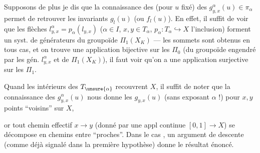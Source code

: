 
Supposons de plus    je dis que la connaissance des (pour $u$ fixé) des $g_{y,x}^\alpha(u)\in\pi_\alpha$  permet de retrouver  les invariants $g_l(u)$ (ou $f_l(u)$). En effet, il suffit de voir que les flèches $l_{y,x}^\alpha=p_\alpha(l_{y,x})$ ($\alpha\in I$, $x,y\in T_\alpha$, $p_\alpha:T_\alpha\hookrightarrow X$ l'inclusion)  forment un syst. de générateurs du groupoïde $\Pi_1(X_K)$ ---  les  sommets sont obtenus en tous cas, et on trouve une application bijective sur les $\Pi_0$ (du groupoïde engendré par les gén. $l_{y,x}^\alpha$  et de $\Pi_1(X_K)$), il faut voir qu'on a une application surjective sur les $\Pi_1$.

Quand les intérieurs des $T_{\unsure{\alpha}}$ recouvrent $X$, il suffit de noter que la connaissance des $g_{y,x}^{\alpha}(u)$ nous donne les $g_{y,x}(u)$ (sans exposant $\alpha$ !) pour $x,y$ points ``voisins'' sur $X$,

or tout chemin effectif $x\longrightarrow y$ (donné par une appl continue $[0,1]\longrightarrow X$) se décompose en  chemins 
entre   ``proches''. Dans le cas ,  un argument de descente (comme déjà signalé dans la première hypothèse) donne le résultat énoncé.


